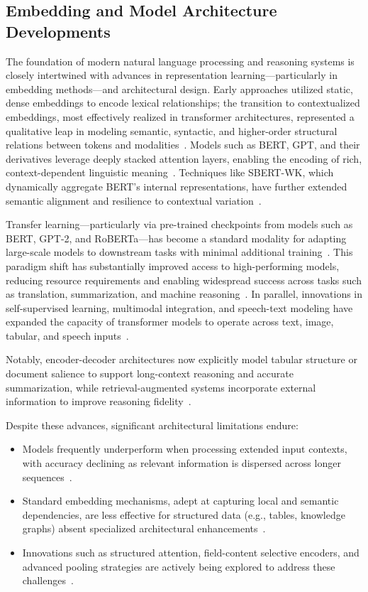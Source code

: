 \subsection{Embedding and Model Architecture Developments}

The foundation of modern natural language processing and reasoning systems is closely intertwined with advances in representation learning---particularly in embedding methods---and architectural design. Early approaches utilized static, dense embeddings to encode lexical relationships; the transition to contextualized embeddings, most effectively realized in transformer architectures, represented a qualitative leap in modeling semantic, syntactic, and higher-order structural relations between tokens and modalities~\cite{ref72,ref74,ref75,ref77}. Models such as BERT, GPT, and their derivatives leverage deeply stacked attention layers, enabling the encoding of rich, context-dependent linguistic meaning~\cite{ref100}. Techniques like SBERT-WK, which dynamically aggregate BERT’s internal representations, have further extended semantic alignment and resilience to contextual variation~\cite{ref74,ref75}.

Transfer learning---particularly via pre-trained checkpoints from models such as BERT, GPT-2, and RoBERTa---has become a standard modality for adapting large-scale models to downstream tasks with minimal additional training~\cite{ref100}. This paradigm shift has substantially improved access to high-performing models, reducing resource requirements and enabling widespread success across tasks such as translation, summarization, and machine reasoning~\cite{ref100}. In parallel, innovations in self-supervised learning, multimodal integration, and speech-text modeling have expanded the capacity of transformer models to operate across text, image, tabular, and speech inputs~\cite{ref72,ref77}.

Notably, encoder-decoder architectures now explicitly model tabular structure or document salience to support long-context reasoning and accurate summarization, while retrieval-augmented systems incorporate external information to improve reasoning fidelity~\cite{ref75,ref77,ref100}. 

Despite these advances, significant architectural limitations endure:

\begin{itemize}
    \item Models frequently underperform when processing extended input contexts, with accuracy declining as relevant information is dispersed across longer sequences~\cite{ref70}.
    \item Standard embedding mechanisms, adept at capturing local and semantic dependencies, are less effective for structured data (e.g., tables, knowledge graphs) absent specialized architectural enhancements~\cite{ref77,ref100}.
    \item Innovations such as structured attention, field-content selective encoders, and advanced pooling strategies are actively being explored to address these challenges~\cite{ref74,ref75,ref77,ref100}.
\end{itemize}

